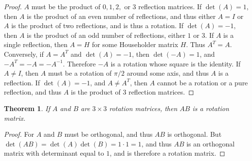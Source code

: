 \documentclass[oneside]{book}
\theoremstyle{mystyle}
\newtheorem{theorem}{Theorem}[section]
\begin{document}
\begin{proof}
$A$ must be the product of $0,1,2,$ or $3$ reflection matrices. If $\det(A) = 1$, then $A$ is the product of an even number of reflections, and thus either $A=I$ or $A$ is the product of two reflections, and is thus a rotation. If $\det(A)=-1$, then $A$ is the product of an odd number of reflections, either $1$ or $3$. If $A$ is a single reflection, then $A=H$ for some Householder matrix $H$. Thus $A^T = A$. Conversely, if $A = A^T$ and $\det(A) = -1$, then $\det(-A) = 1$, and $-A^T = -A = -A^{-1}$. Therefore $-A$ is a rotation whose square is the identity. If $A\ne I$, then $A$ must be a rotation of $\pi/2$ around some axis, and thus $A$ is a reflection. If $\det(A) = -1$, and $A\ne A^T$, then $A$ cannot be a rotation or a pure reflection, and thus $A$ is the product of $3$ reflection matrices.
\end{proof}
\begin{theorem}
If $A$ and $B$ are $3\times 3$ rotation matrices, then $AB$ is a rotation matrix.
\end{theorem}
\begin{proof}
For $A$ and $B$ must be orthogonal, and thus $AB$ is orthogonal. But $\det(AB) = \det(A)\det(B) = 1\cdot 1 = 1$, and thus $AB$ is an orthogonal matrix with determinant equal to $1$, and is therefore a rotation matrix.
\end{proof}
\end{document}
